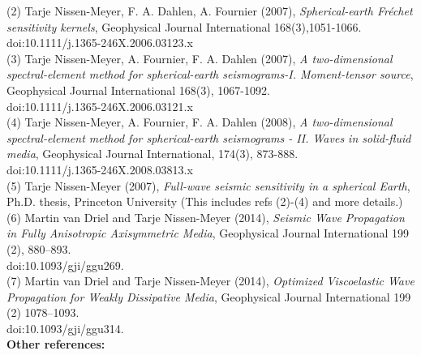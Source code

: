 \documentclass{article}
\begin{document}
(2) Tarje Nissen-Meyer, F. A. Dahlen, A. Fournier (2007),
\textit{Spherical-earth Fr\'{e}chet sensitivity kernels},
Geophysical Journal International 168(3),1051-1066. \\
doi:10.1111/j.1365-246X.2006.03123.x                \\

(3) Tarje Nissen-Meyer, A. Fournier, F. A. Dahlen (2007),
\textit{A two-dimensional spectral-element method for
spherical-earth seismograms-I. Moment-tensor source},
Geophysical Journal International 168(3), 1067-1092. \\
doi:10.1111/j.1365-246X.2006.03121.x                 \\

(4) Tarje Nissen-Meyer, A. Fournier, F. A. Dahlen (2008),
\textit{A two-dimensional spectral-element method for
spherical-earth seismograms - II. Waves in solid-fluid media},
Geophysical Journal International, 174(3), 873-888.\\
doi:10.1111/j.1365-246X.2008.03813.x\\

(5) Tarje Nissen-Meyer (2007),
\textit{Full-wave seismic sensitivity in a spherical Earth},
Ph.D. thesis, Princeton University
(This includes refs (2)-(4) and more details.)\\

(6) Martin van Driel and Tarje Nissen-Meyer (2014),
\textit{Seismic Wave Propagation in Fully Anisotropic Axisymmetric Media},
Geophysical Journal International 199 (2), 880–893.\\
doi:10.1093/gji/ggu269.\\

(7) Martin van Driel and Tarje Nissen-Meyer (2014),
\textit{Optimized Viscoelastic Wave Propagation for Weakly Dissipative Media},
Geophysical Journal International 199 (2) 1078–1093.\\
doi:10.1093/gji/ggu314.\\

%


\noindent \textbf{Other references:}\vspace*{0.2cm}
\end{document}
